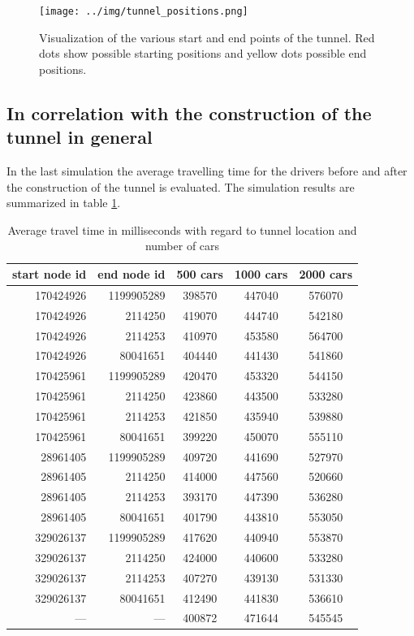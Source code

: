 \documentclass[11pt]{article}
\begin{document}
\begin{figure}[htb]
	\begin{center}
		\texttt{[image: ../img/tunnel\_positions.png]}
	\end{center}
	\caption{Visualization of the various start and end points of the tunnel.
	Red dots show possible starting positions and yellow dots possible end positions.}
	\label{fig:tunnel_pos}
\end{figure}

\subsection{In correlation with the construction of the tunnel in general} %
\label{sub:in_correlation_with_the_construction_of_the_tunnel_in_general}
In the last simulation the average travelling time for the drivers before and after the construction of the tunnel is evaluated. The simulation results are summarized in table \ref{tab:times}.


\begin{table}[tb]
	\caption{Average travel time in milliseconds with regard to tunnel location and number of cars}
	\label{tab:times}
	\begin{center}
		\begin{tabular}{rrccc}
		\toprule
		start node id & end node id & 500 cars & 1000 cars & 2000 cars \\
		\midrule
			170424926 & 1199905289 & 398570 & 447040 & 576070 \\
			170424926 & 2114250 & 419070 & 444740 & 542180 \\
			170424926 & 2114253 & 410970 & 453580 & 564700 \\
			170424926 & 80041651 & 404440 & 441430 & 541860 \\
			170425961 & 1199905289 & 420470 & 453320 & 544150 \\
			170425961 & 2114250 & 423860 & 443500 & 533280 \\
			170425961 & 2114253 & 421850 & 435940 & 539880 \\
			170425961 & 80041651 & 399220 & 450070 & 555110 \\
			28961405 & 1199905289 & 409720 & 441690 & 527970 \\
			28961405 & 2114250 & 414000 & 447560 & 520660 \\
			28961405 & 2114253 & 393170 & 447390 & 536280 \\
			28961405 & 80041651 & 401790 & 443810 & 553050 \\
			329026137 & 1199905289 & 417620 & 440940 & 553870 \\
			329026137 & 2114250 & 424000 & 440600 & 533280 \\
			329026137 & 2114253 & 407270 & 439130 & 531330 \\
			329026137 & 80041651 & 412490 & 441830 & 536610 \\
			--- & --- & 400872 & 471644 & 545545 \\
		\bottomrule
		\end{tabular}
	\end{center}
\end{table}
\end{document}
